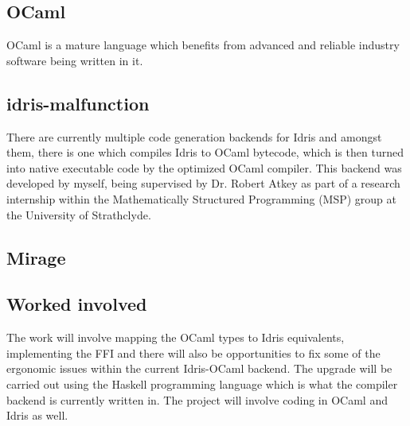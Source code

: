 \documentclass[a4paper]{report}
\begin{document}
\subsection{OCaml}
OCaml is a mature language which benefits from advanced and
reliable industry software being written
in it.




\subsection{idris-malfunction}
There are currently multiple code generation backends for Idris and amongst
them, there is one which compiles Idris to OCaml bytecode, which is then
turned into native executable code by the optimized OCaml compiler.
This backend was developed by myself, being supervised by Dr. Robert Atkey
as part of a research internship within the Mathematically Structured
Programming (MSP) group at the University of Strathclyde.


\subsection{Mirage}

\subsection{Worked involved}
The work will involve mapping the OCaml types to Idris equivalents,
implementing the FFI and there will also be opportunities to fix some of the
ergonomic issues within the current Idris-OCaml backend.
The upgrade will be carried out using the Haskell programming language which is
what the compiler backend is currently written in. The project will involve
coding in OCaml and Idris as well.
\end{document}
